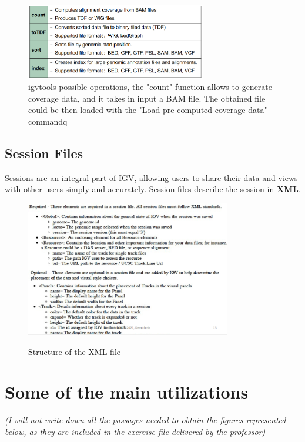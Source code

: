 \begin{figure}[H]
    \caption{igvtools possible operations, the "count" function allows to generate coverage data, and it takes in input a BAM file. The obtained 
    file could be then loaded with the "Load pre-computed coverage data" commandq}
    \centering
    \includegraphics[width=0.7\textwidth]{igvtools.PNG}
\end{figure}

\subsection{Session Files}
Sessions are an integral part of IGV, allowing users to share their data and
views with other users simply and accurately. Session files describe the session
in \textbf{XML}.

\begin{figure}[H]
    \caption{Structure of the XML file}
    \centering
    \includegraphics[width=0.8\textwidth]{structureXMLfile.PNG}
    \label{XMLfile}
\end{figure} 


\section{Some of the main utilizations}
\textit{(I will not write down all the passages needed to obtain the figures
represented below, as they are included in the exercise file delivered by the
professor)}

